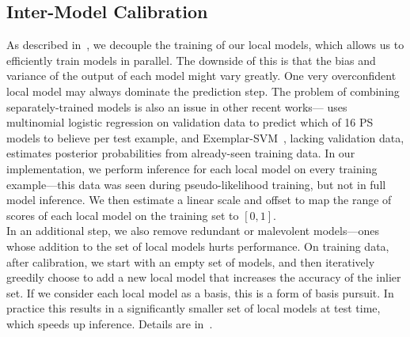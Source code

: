 \subsection{Inter-Model Calibration}\label{sec:calib}  As described 
in~, we decouple the training of our local models, which 
allows us to efficiently train models in parallel.  The downside of this is 
that the bias and variance of the output of each model might vary greatly.  One 
very overconfident local model may always dominate the prediction step.  The 
problem of combining separately-trained models is also an issue in other recent 
works---\citet{johnson11} uses multinomial logistic regression on validation 
data to predict which of 16 PS models to believe per test example, and
Exemplar-SVM~\citep{esvm}, lacking validation data, estimates posterior 
probabilities from already-seen training data. In our implementation, we 
perform inference for each local model on every training example---this data 
was seen during pseudo-likelihood training, but not in full model inference.  
We then estimate a linear scale and offset to map the range of scores of each 
local model on the training set to $[0,1]$.  \\
 In an additional step, we also remove redundant or 
malevolent models---ones whose addition to the set of local models hurts 
performance.  On training data, after calibration, we start with an empty set 
of models, and then iteratively greedily choose to add a new local model that 
increases the accuracy of the inlier set.  If we consider each local model as a 
basis, this is a form of basis pursuit.  In practice this results in a 
significantly smaller set of local models at test time, which speeds up 
inference. Details are in~.  

